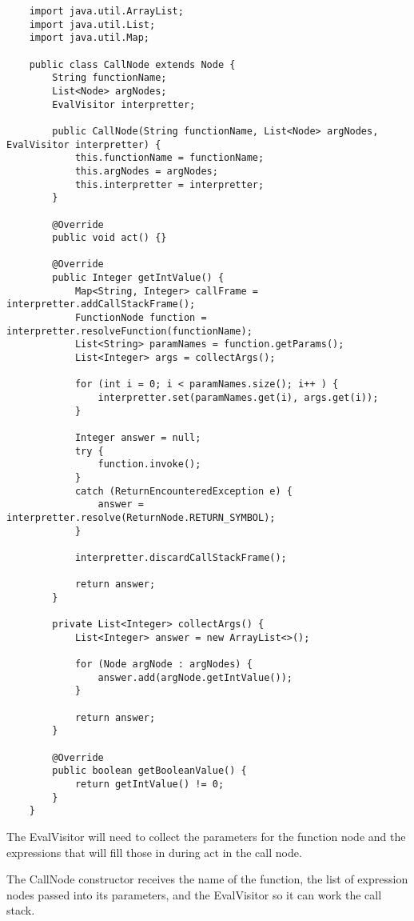 {\footnotesize
\begin{verbatim}
    import java.util.ArrayList;
    import java.util.List;
    import java.util.Map;
    
    public class CallNode extends Node {
        String functionName;
        List<Node> argNodes;
        EvalVisitor interpretter;
    
        public CallNode(String functionName, List<Node> argNodes, EvalVisitor interpretter) {
            this.functionName = functionName;
            this.argNodes = argNodes;
            this.interpretter = interpretter;
        }
    
        @Override
        public void act() {}
    
        @Override
        public Integer getIntValue() {
            Map<String, Integer> callFrame = interpretter.addCallStackFrame();
            FunctionNode function = interpretter.resolveFunction(functionName);
            List<String> paramNames = function.getParams();
            List<Integer> args = collectArgs();
    
            for (int i = 0; i < paramNames.size(); i++ ) {
                interpretter.set(paramNames.get(i), args.get(i));
            }
    
            Integer answer = null;
            try {
                function.invoke();
            }
            catch (ReturnEncounteredException e) {
                answer = interpretter.resolve(ReturnNode.RETURN_SYMBOL);
            }
    
            interpretter.discardCallStackFrame();
    
            return answer;
        }
    
        private List<Integer> collectArgs() {
            List<Integer> answer = new ArrayList<>();
    
            for (Node argNode : argNodes) {
                answer.add(argNode.getIntValue());
            }
    
            return answer;
        }
    
        @Override
        public boolean getBooleanValue() {
            return getIntValue() != 0;
        }
    }
\end{verbatim}
}

The EvalVisitor will need to collect the parameters for the function node
and the expressions that will fill those in during act in the call node.

The CallNode constructor receives the name of the function, the
list of expression nodes passed into its parameters, and the EvalVisitor
so it can work the call stack.

